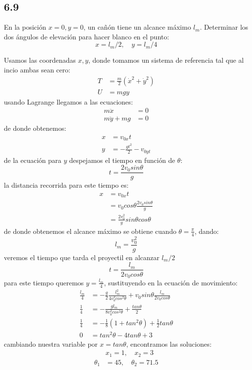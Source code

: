 \documentclass{article}
\begin{document}
\subsection*{6.9}
En la posición $x=0, y=0$, un cañón tiene un alcance máximo $l_m$. Determinar los dos 
ángulos de elevación para hacer blanco en el punto:
\[ x = l_m/2, \quad y=l_m/4 \]
\begin{tcolorbox}[breakable]
    Usamos las coordenadas $x,y$, donde tomamos un sistema de referencia
    tal que al incio ambas sean cero:
    \begin{align*}
        T &= \frac{m}{2}(\dot{x}^2+\dot{y}^2) \\
        U &= mgy 
    \end{align*}
    usando Lagrange llegamos a las ecuaciones:
    \begin{align*}
        m\ddot{x} &= 0 \\
        m\ddot{y} + mg &= 0
    \end{align*}
    de donde obtenemos:
    \begin{align*}
        x &= v_{0x}t \\
        y &= -\frac{gt^2}{2}-v_{0yt}
    \end{align*}
    de la ecuación para $y$ despejamos el tiempo en función de $\theta$:
    \[ t = \frac{2v_0sin\theta}{g} \]
    la distancia recorrida para este tiempo es:
    \begin{align*}
        x 
        &= v_{0x}t \\
        &= v_0cos\theta \frac{2v_0sin\theta}{g} \\
        &= \frac{2v_0^2}{g}sin\theta cos\theta
    \end{align*}
    de donde obtenemos el alcance máximo se obtiene cuando $\theta=\frac{\pi}{4}$, dando:
    \[ l_m = \frac{v_0^2}{g} \]
    veremos el tiempo que tarda el proyectil en alcanzar $l_m/2$
    \[ t = \frac{l_m}{2v_0cos\theta} \]
    para este tiempo queremos $y = \frac{l_m}{4}$, sustituyendo en la ecuación de movimiento:
    \begin{align*}
        \frac{l_m}{4} &= -\frac{g}{2}\frac{l_m^2}{4v_0^2cos^2\theta} + v_0sin\theta\frac{l_m}{2v_0cos\theta} \\
        \frac{1}{4} &= -\frac{gl_m}{8v_0^2cos^2\theta} + \frac{tan\theta}{2} \\
        \frac{1}{4} &= -\frac{1}{8}(1+tan^2\theta) + \frac{1}{2}tan\theta \\
        0 &= tan^2\theta - 4tan\theta + 3
    \end{align*}
    cambiando nuestra variable por $x=tan\theta$, encontramos las soluciones:
    \begin{align*}
        &x_1 = 1, \quad x_2 = 3 \\
        \theta_1 &= 45, \quad \theta_2 = 71.5
    \end{align*}
\end{tcolorbox}
\end{document}

